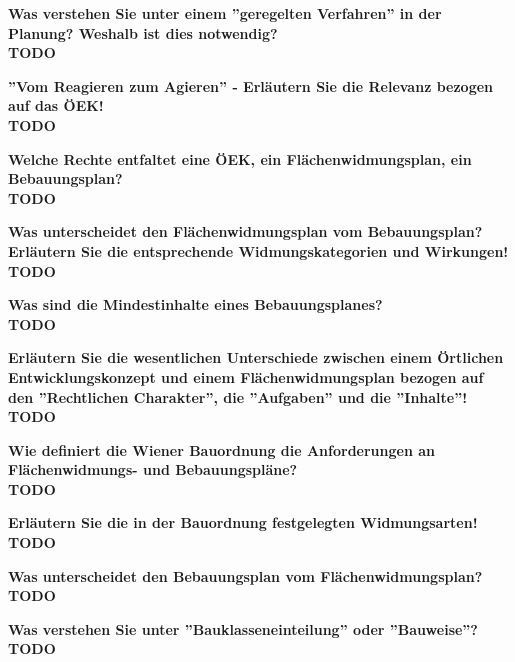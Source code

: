 \documentclass[]{article}
\newenvironment{question}{\vspace{8mm}\noindent\bfseries}{\\}
\begin{document}
\begin{question}
	Was verstehen Sie unter einem ''geregelten Verfahren'' in der Planung? Weshalb ist dies notwendig?
\end{question}
TODO


\begin{question}
	''Vom Reagieren zum Agieren'' - Erläutern Sie die Relevanz bezogen auf das ÖEK!
\end{question}
TODO

\begin{question}
	Welche Rechte entfaltet eine ÖEK, ein Flächenwidmungsplan, ein Bebauungsplan?
\end{question}
TODO

\begin{question}
	Was unterscheidet den Flächenwidmungsplan vom Bebauungsplan? Erläutern Sie die entsprechende Widmungskategorien und Wirkungen!
\end{question}
TODO

\begin{question}
	Was sind die Mindestinhalte eines Bebauungsplanes?
\end{question}
TODO

\begin{question}
	Erläutern Sie die wesentlichen Unterschiede zwischen einem Örtlichen Entwicklungskonzept und einem Flächenwidmungsplan bezogen auf den ''Rechtlichen Charakter'', die ''Aufgaben'' und die ''Inhalte''!
\end{question}
TODO

\begin{question}
	Wie definiert die Wiener Bauordnung die Anforderungen an Flächenwidmungs- und Bebauungspläne?
\end{question}
TODO

\begin{question}
	Erläutern Sie die in der Bauordnung festgelegten Widmungsarten!
\end{question}
TODO

\begin{question}
	Was unterscheidet den Bebauungsplan vom Flächenwidmungsplan?
\end{question}
TODO

\begin{question}
	Was verstehen Sie unter ''Bauklasseneinteilung'' oder ''Bauweise''?
\end{question}
TODO
\end{document}
